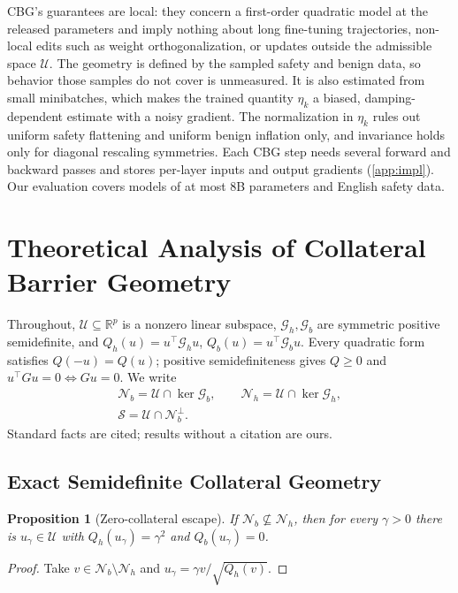 \documentclass[11pt]{article}
\newtheorem{proposition}{Proposition}
\newcommand{\R}{\mathbb{R}}
\newcommand{\Gh}{\mathcal{G}_{h}}
\newcommand{\Gb}{\mathcal{G}_{b}}
\newcommand{\U}{\mathcal{U}}
\newcommand{\etak}{\eta_{k}}
\newcommand{\Nb}{\mathcal{N}_{b}}
\newcommand{\Nh}{\mathcal{N}_{h}}
\begin{document}
CBG's guarantees are local: they concern a first-order quadratic model at the released parameters and imply nothing about long fine-tuning trajectories, non-local edits such as weight orthogonalization, or updates outside the admissible space $\U$. The geometry is defined by the sampled safety and benign data, so behavior those samples do not cover is unmeasured. It is also estimated from small minibatches, which makes the trained quantity $\etak$ a biased, damping-dependent estimate with a noisy gradient. The normalization in $\etak$ rules out uniform safety flattening and uniform benign inflation only, and invariance holds only for diagonal rescaling symmetries. Each CBG step needs several forward and backward passes and stores per-layer inputs and output gradients (\cref{app:impl}). Our evaluation covers models of at most 8B parameters and English safety data.




\appendix

\section{Theoretical Analysis of Collateral Barrier Geometry}
\label{app:cbg_theory}

Throughout, $\U\subseteq\R^p$ is a nonzero linear subspace, $\Gh,\Gb$ are symmetric positive semidefinite, and $Q_h(u)=u^\top\Gh u$, $Q_b(u)=u^\top\Gb u$. Every quadratic form satisfies $Q(-u)=Q(u)$; positive semidefiniteness gives $Q\ge0$ and $u^\top Gu=0\Leftrightarrow Gu=0$. We write
\begin{equation*}
\begin{gathered}
\Nb=\U\cap\ker\Gb,\qquad \Nh=\U\cap\ker\Gh,\\
\mathcal S=\U\cap\Nb^\perp .
\end{gathered}
\end{equation*}
Standard facts are cited; results without a citation are ours.

\subsection{Exact Semidefinite Collateral Geometry}
\label{app:cbg_exact_geometry}

\begin{proposition}[Zero-collateral escape]
\label{prop:zero}
If $\Nb\not\subseteq\Nh$, then for every $\gamma>0$ there is $u_\gamma\in\U$ with $Q_h(u_\gamma)=\gamma^2$ and $Q_b(u_\gamma)=0$.
\end{proposition}
\begin{proof}
Take $v\in\Nb\setminus\Nh$ and $u_\gamma=\gamma v/\sqrt{Q_h(v)}$.
\end{proof}
\end{document}
